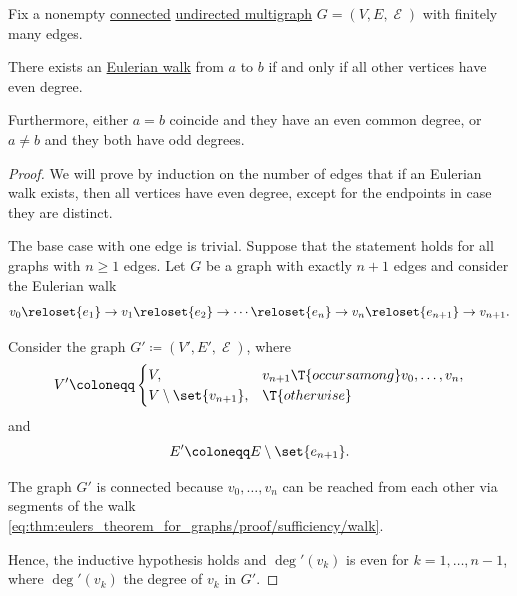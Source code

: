 \begin{theorem}\label{thm:eulers_theorem_for_graphs}
  Fix a nonempty \hyperref[def:graph_connectedness/undirected]{connected} \hyperref[def:hypergraph/multigraph]{undirected multigraph} \( G = (V, E, \mscrE) \) with finitely many edges.

  There exists an \hyperref[def:eulerian_walk]{Eulerian walk} from \( a \) to \( b \) if and only if all other vertices have even degree.

  Furthermore, either \( a = b \) coincide and they have an even common degree, or \( a \neq b \) and they both have odd degrees.
\end{theorem}
\begin{proof}
  \SufficiencySubProof We will prove by induction on the number of edges that if an Eulerian walk exists, then all vertices have even degree, except for the endpoints in case they are distinct.

  The base case with one edge is trivial. Suppose that the statement holds for all graphs with \( n \geq 1 \) edges. Let \( G \) be a graph with exactly \( n + 1 \) edges and consider the Eulerian walk
  \begin{equation}\label{eq:thm:eulers_theorem_for_graphs/proof/sufficiency/walk}
    v_0 \reloset {e_1} \to v_1 \reloset {e_2} \to \cdots \reloset {e_n} \to v_n \reloset {e_{n+1}} \to v_{n+1}.
  \end{equation}

  Consider the graph \( G' \coloneqq (V', E', \mscrE) \), where
  \begin{equation*}
    V' \coloneqq \begin{cases}
      V,                           &v_{n+1} \T{occurs among} v_0, \ldots, v_n, \\
      V \setminus \set{ v_{n+1} }, &\T{otherwise}
    \end{cases}
  \end{equation*}
  and
  \begin{equation*}
    E' \coloneqq E \setminus \set{ e_{n+1} }.
  \end{equation*}

  The graph \( G' \) is connected because \( v_0, \ldots, v_n \) can be reached from each other via segments of the walk \eqref{eq:thm:eulers_theorem_for_graphs/proof/sufficiency/walk}.

  Hence, the inductive hypothesis holds and \( \deg'(v_k) \) is even for \( k = 1, \ldots, n - 1 \), where \( \deg'(v_k) \) the degree of \( v_k \) in \( G' \).


\end{proof}
